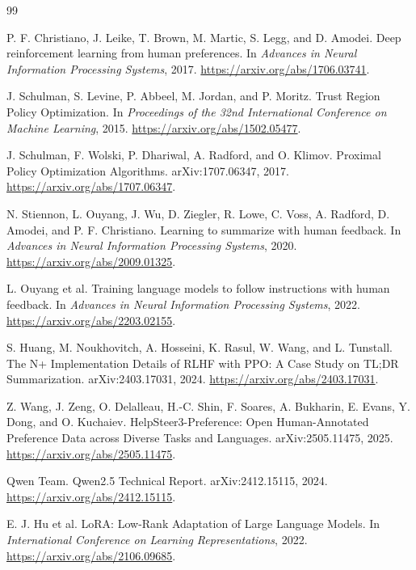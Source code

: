 \documentclass[11pt]{article}
\begin{document}
\begin{thebibliography}{99}

P. F. Christiano, J. Leike, T. Brown, M. Martic, S. Legg, and D. Amodei.
\newblock Deep reinforcement learning from human preferences.
\newblock In \emph{Advances in Neural Information Processing Systems}, 2017.
\newblock \url{https://arxiv.org/abs/1706.03741}.

J. Schulman, S. Levine, P. Abbeel, M. Jordan, and P. Moritz.
\newblock Trust Region Policy Optimization.
\newblock In \emph{Proceedings of the 32nd International Conference on Machine
Learning}, 2015.
\newblock \url{https://arxiv.org/abs/1502.05477}.

J. Schulman, F. Wolski, P. Dhariwal, A. Radford, and O. Klimov.
\newblock Proximal Policy Optimization Algorithms.
\newblock arXiv:1707.06347, 2017.
\newblock \url{https://arxiv.org/abs/1707.06347}.

N. Stiennon, L. Ouyang, J. Wu, D. Ziegler, R. Lowe, C. Voss,
A. Radford, D. Amodei, and P. F. Christiano.
\newblock Learning to summarize with human feedback.
\newblock In \emph{Advances in Neural Information Processing Systems}, 2020.
\newblock \url{https://arxiv.org/abs/2009.01325}.

L. Ouyang et al.
\newblock Training language models to follow instructions with human feedback.
\newblock In \emph{Advances in Neural Information Processing Systems}, 2022.
\newblock \url{https://arxiv.org/abs/2203.02155}.

S. Huang, M. Noukhovitch, A. Hosseini, K. Rasul, W. Wang, and L. Tunstall.
\newblock The N+ Implementation Details of RLHF with PPO: A Case Study on
TL;DR Summarization.
\newblock arXiv:2403.17031, 2024.
\newblock \url{https://arxiv.org/abs/2403.17031}.

Z. Wang, J. Zeng, O. Delalleau, H.-C. Shin, F. Soares, A. Bukharin,
E. Evans, Y. Dong, and O. Kuchaiev.
\newblock HelpSteer3-Preference: Open Human-Annotated Preference Data across
Diverse Tasks and Languages.
\newblock arXiv:2505.11475, 2025.
\newblock \url{https://arxiv.org/abs/2505.11475}.

Qwen Team.
\newblock Qwen2.5 Technical Report.
\newblock arXiv:2412.15115, 2024.
\newblock \url{https://arxiv.org/abs/2412.15115}.

E. J. Hu et al.
\newblock LoRA: Low-Rank Adaptation of Large Language Models.
\newblock In \emph{International Conference on Learning Representations},
2022.
\newblock \url{https://arxiv.org/abs/2106.09685}.


\end{thebibliography}
\end{document}
